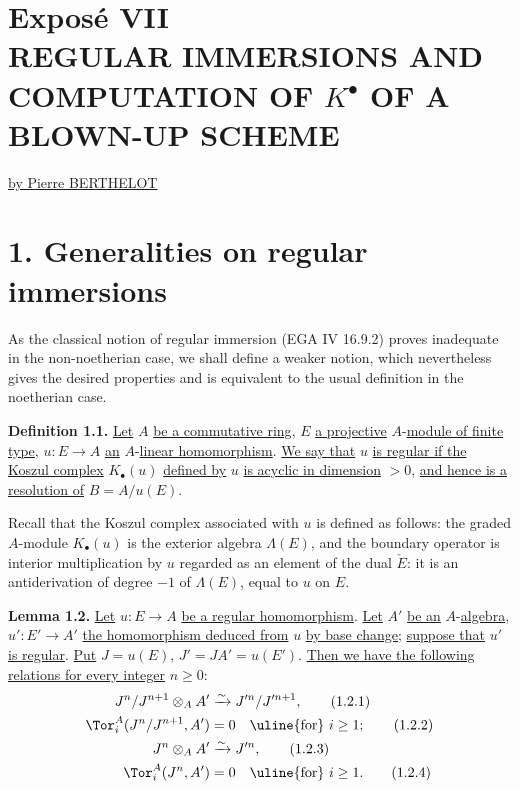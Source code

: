 %
\renewcommand{\Sym}{\operatorname{Sym}}
\renewcommand{\Projz}{\operatorname{Proj}_0}
\section*{Exposé VII\\[3pt] REGULAR IMMERSIONS AND COMPUTATION OF \texorpdfstring{$K^{\bullet}$}{K0} OF A BLOWN-UP SCHEME}
\begin{center}
\uline{by Pierre BERTHELOT}
\end{center}

\section*{1. Generalities on regular immersions}

As the classical notion of regular immersion (EGA IV 16.9.2) proves inadequate in the non-noetherian case, we shall define a weaker notion, which nevertheless gives the desired properties and is equivalent to the usual definition in the noetherian case.

\textbf{Definition 1.1.} \uline{Let} $A$ \uline{be a commutative ring}, $E$ \uline{a projective} $A$-\uline{module of finite type}, $u:E\longrightarrow A$ \uline{an} $A$-\uline{linear homomorphism}. \uline{We say that} $u$ \uline{is regular if the Koszul complex} $K_\bullet(u)$ \uline{defined by} $u$ \uline{is acyclic in dimension} $>0$, \uline{and hence is a resolution of} $B=A/u(E)$.

Recall that the Koszul complex associated with $u$ is defined as follows: the graded $A$-module $K_\bullet(u)$ is the exterior algebra $\Lambda(E)$, and the boundary operator is interior multiplication by $u$ regarded as an element of the dual $\check E$: it is an antiderivation of degree $-1$ of $\Lambda(E)$, equal to $u$ on $E$.

\textbf{Lemma 1.2.} \uline{Let} $u:E\longrightarrow A$ \uline{be a regular homomorphism}. \uline{Let} $A'$ \uline{be an} $A$-\uline{algebra}, $u':E'\longrightarrow A'$ \uline{the homomorphism deduced from} $u$ \uline{by base change}; \uline{suppose that} $u'$ \uline{is regular}. \uline{Put} $J=u(E)$, $J'=JA'=u(E')$. \uline{Then we have the following relations for every integer} $n\geq0$:
\begin{align}
 J^n/J^{n+1}\otimes_AA'&\xrightarrow{\sim}J'^n/J'^{n+1}, \tag{1.2.1}\\
 \Tor_i^A(J^n/J^{n+1},A')&=0\quad\text{\uline{for} }i\geq1; \tag{1.2.2}\\
 J^n\otimes_AA'&\xrightarrow{\sim}J'^n, \tag{1.2.3}\\
 \Tor_i^A(J^n,A')&=0\quad\text{\uline{for} }i\geq1. \tag{1.2.4}
\end{align}

